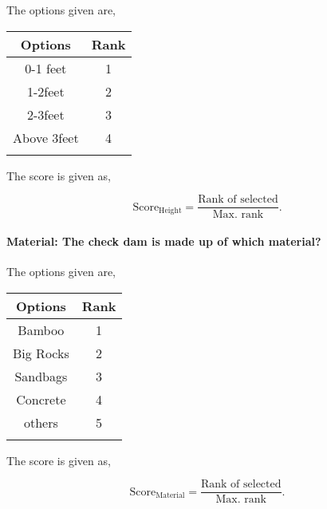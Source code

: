 \documentclass[oneside,twocolumn]{article}
\newcommand{\tsub}[2]{\text{#1}_{\text{#2}}}
\newcommand{\dsub}[2]{\dfrac{\text{#1}}{\text{#2}}}
\newcommand{\singsel}[1]
{
	\[
		\tsub{Score}{#1} = \dsub{Rank of selected}{Max. rank}.
	\]
}
\newenvironment{ttable}
{
\begin{center}
\begin{tabular}{c|c}
\hline
}
{
\\ \hline
\end{tabular}
\end{center}
}
\begin{document}
The options given are,
\begin{ttable}
Options & Rank \\ \hline
0-1 feet & 1 \\
1-2feet & 2 \\
2-3feet & 3 \\
Above 3feet & 4 \\
\hline
\end{ttable}
The score is given as,
\singsel{Height}
\paragraph{Material: The check dam is made up of which material?}

The options given are,
\begin{ttable}
Options & Rank \\ \hline
Bamboo & 1 \\
Big Rocks & 2 \\
Sandbags & 3 \\
Concrete & 4 \\
others & 5 \\
\hline
\end{ttable}
The score is given as,
\singsel{Material}
\end{document}
